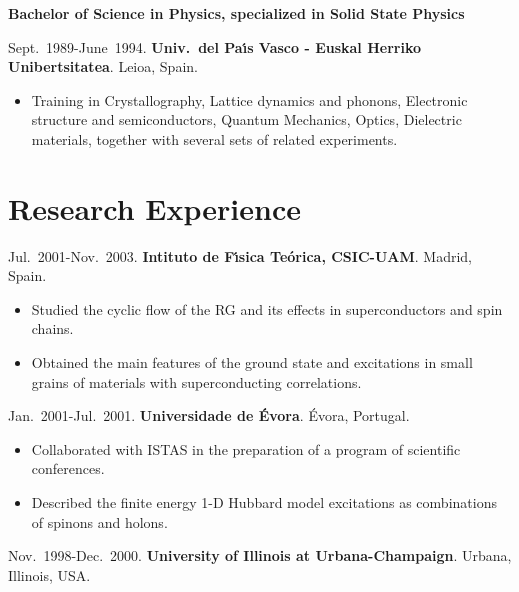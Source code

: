 \documentclass{article}
\begin{document}
\medskip
{\bf Bachelor of Science in Physics, specialized in Solid State Physics}

\medskip
Sept.~1989-June~1994.
{\bf Univ.\ del Pa\'{\i}s Vasco - Euskal Herriko Unibertsitatea}.
Leioa, Spain.

\begin{itemize}\itemsep 0pt
\item Training in Crystallography, Lattice dynamics and phonons, Electronic structure and semiconductors, Quantum Mechanics, Optics, Dielectric materials, together with several sets of related experiments.
\end{itemize}


\section*{Research Experience}

Jul.~2001-Nov.~2003. 
{\bf Intituto de F\'{\i}sica Te\'orica, CSIC-UAM}. 
Madrid, Spain. 

\begin{itemize}\itemsep 0pt
\item Studied the cyclic flow of the RG and its effects in 
superconductors and spin chains.

\item Obtained the main features of the ground state and excitations in small 
grains of materials with superconducting correlations.
\end{itemize}


Jan.~2001-Jul.~2001. {\bf Universidade de \'Evora}. \'Evora, Portugal.

\begin{itemize}\itemsep 0pt
\item Collaborated with ISTAS in the preparation of a program of scientific 
conferences.

\item Described the finite energy 1-D Hubbard model excitations as
combinations of spinons and holons.
\end{itemize}

Nov.~1998-Dec.~2000. 
{\bf University of Illinois at Urbana-Champaign}. Urbana, Illinois, USA.
\end{document}
